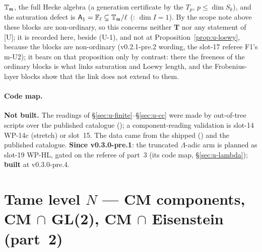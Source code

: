 \documentclass[11pt]{article}
\newcommand{\Iw}{\Lambda}                         %
\newcommand{\Tu}{\mathbf{T}}                      %
\begin{document}
$\mathbb{T}_{\mathfrak m}$, the full Hecke algebra (a generation certificate by the $T_p$, $p\le\dim S_k$), and the saturation defect is $\mathsf A_1=\mathbb{F}_\ell\subsetneq\mathbb{T}_{\mathfrak m}/\ell$
(: $\dim I=1$). By the scope note above these blocks are non-ordinary, so this concerns neither $\Tu$ nor any statement of [U]; it is
recorded here, beside (U-1), and not at Proposition~\ref{prop:u-loewy}, because the blocks are non-ordinary (v0.2.1-pre.2 wording, the slot-17 referee F1's
m-U2); it bears on that proposition only by contrast: there the freeness of the ordinary blocks is what links saturation and Loewy length, and the
Frobenius-layer blocks show that the link does not extend to them.

\paragraph{Code map.} \textbf{Not built.} The readings of \S\ref{sec:u-finite}--\S\ref{sec:u-cc} were made by out-of-tree scripts over the published catalogue
(); a component-reading validation is slot-14 WP-14c (stretch) or slot~15. The data came from the shipped
 () and the published  catalogue. \textbf{Since v0.3.0-pre.1}: the truncated $\Iw$-adic arm is planned as slot-19 WP-HL, gated on the referee of part~3 (its code map,
\S\ref{sec:u-lambda}); \textbf{built} at v0.3.0-pre.4.

\section{Tame level \texorpdfstring{$N$}{N} --- CM components, CM \texorpdfstring{$\cap$}{cap} GL(2), CM \texorpdfstring{$\cap$}{cap} Eisenstein (part~2)}\label{sec:u-tameN}
\end{document}
